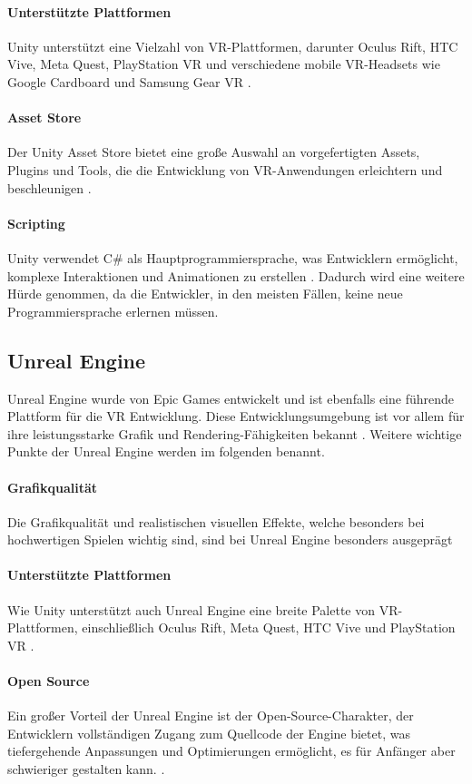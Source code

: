 \paragraph{Unterstützte Plattformen} Unity unterstützt eine Vielzahl von VR-Plattformen, darunter Oculus Rift, HTC Vive, Meta Quest, PlayStation VR und verschiedene mobile VR-Headsets wie Google Cardboard und Samsung Gear VR \cite{unity2021}.
\paragraph{Asset Store}
Der Unity Asset Store bietet eine große Auswahl an vorgefertigten Assets, Plugins und Tools, die die Entwicklung von VR-Anwendungen erleichtern und beschleunigen \cite{unityAssetStore2021}.
\paragraph{Scripting}
Unity verwendet C\# als Hauptprogrammiersprache, was Entwicklern ermöglicht, komplexe Interaktionen und Animationen zu erstellen \cite{unity2021}. Dadurch wird eine weitere Hürde genommen, da die Entwickler, in den meisten Fällen, keine neue Programmiersprache erlernen müssen.
\subsection{Unreal Engine}
Unreal Engine wurde von Epic Games entwickelt und ist ebenfalls eine führende Plattform für die VR Entwicklung. Diese Entwicklungsumgebung ist vor allem für ihre leistungsstarke Grafik und Rendering-Fähigkeiten bekannt . Weitere wichtige Punkte der Unreal Engine werden im folgenden benannt.
\paragraph{Grafikqualität} Die Grafikqualität und realistischen visuellen Effekte, welche besonders bei hochwertigen Spielen wichtig sind, sind bei Unreal Engine besonders ausgeprägt \cite{epic2021}
\paragraph{Unterstützte Plattformen} Wie Unity unterstützt auch Unreal Engine eine breite Palette von VR-Plattformen, einschließlich Oculus Rift, Meta Quest, HTC Vive und PlayStation VR \cite{epic2021}.
\paragraph{Open Source}
Ein großer Vorteil der Unreal Engine ist der Open-Source-Charakter, der Entwicklern vollständigen Zugang zum Quellcode der Engine bietet, was tiefergehende Anpassungen und Optimierungen ermöglicht, es für Anfänger aber schwieriger gestalten kann. \cite{epic2021}.

